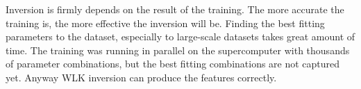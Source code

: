 Inversion is firmly depends on the result of the training. The more accurate the training is, the more effective the inversion will be. Finding the best fitting parameters to the dataset, especially to large-scale datasets takes great amount of time. The training was running in parallel on the supercomputer with thousands of parameter combinations, but the best fitting combinations are not captured yet. Anyway WLK inversion can produce the features correctly. 

